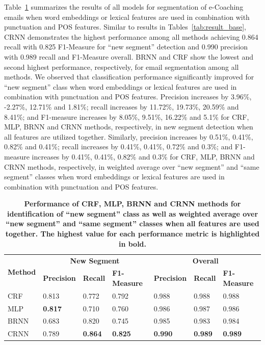 \documentclass{amia}
\begin{document}
Table~\ref{tab:result_weighted_avg} summarizes the results of all models for segmentation of e-Coaching emails when word embeddings or lexical features are used in combination with punctuation and POS features. Similar to results in Tables~\ref{tab:result_base}, CRNN demonstrates the highest performance among all methods achieving 0.864 recall with 0.825 F1-Measure for ``new segment'' detection and 0.990 precision with 0.989 recall and F1-Measure overall. BRNN and CRF show the lowest and second highest performance, respectively, for email segmentation among all methods. We observed that classification performance significantly improved for ``new segment'' class when word embeddings or lexical features are used in combination with punctuation and POS features. Precision increases by 3.96\%, -2.27\%, 12.71\% and 1.81\%; recall increases by 11.72\%, 19.73\%, 20.59\% and 8.41\%; and F1-measure increases by 8.05\%, 9.51\%, 16.22\% and 5.1\% for CRF, MLP, BRNN and CRNN methods, respectively, in new segment detection when all features are utilized together. Similarly, precision increases by 0.51\%, 0.41\%, 0.82\% and 0.41\%; recall increases by 0.41\%, 0.41\%, 0.72\% and 0.3\%; and F1-measure increases by 0.41\%, 0.41\%, 0.82\% and 0.3\% for CRF, MLP, BRNN and CRNN methods, respectively, in weighted average over ``new segment'' and ``same segment'' classes when word embeddings or lexical features are used in combination with punctuation and POS features.\\

\begin{table}[ht]
\centering
\caption{\textbf{Performance of CRF, MLP, BRNN and CRNN methods for identification of ``new segment'' class as well as weighted average over ``new segment'' and ``same segment'' classes when all features are used together. The highest value for each performance metric
is highlighted in bold.}}
\label{tab:result_weighted_avg}
 \begin{tabular}{|l|l|l|l|l|l|l|}
  \hline
   \multirow{2}{*}{\textbf{Method}} & \multicolumn{3}{|c|}{\textbf{New Segment}} & \multicolumn{3}{|c|}{\textbf{Overall}} \\\cline{2-7}
   & \textbf{Precision}  & \textbf{Recall} & \textbf{F1-Measure} & \textbf{Precision}  & \textbf{Recall} & \textbf{F1-Measure} \\ \hline    
 CRF & 0.813 & 0.772 & 0.792 & 0.988 & 0.988 & 0.988 \\ \hline
 MLP & \textbf{0.817} & 0.710 & 0.760 & 0.986 & 0.987 & 0.986 \\ \hline
 BRNN & 0.683 & 0.820 & 0.745 & 0.985 & 0.983 & 0.984 \\ \hline
 CRNN & 0.789 & \textbf{0.864} & \textbf{0.825} & \textbf{0.990} & \textbf{0.989} & \textbf{0.989} \\ \hline
  \end{tabular}
\end{table}       
\end{document}
